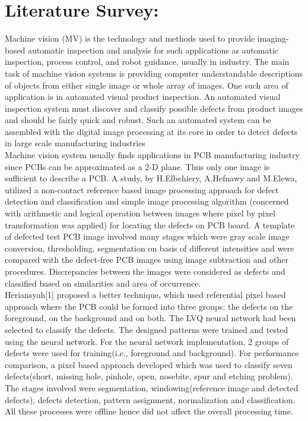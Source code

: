 \documentclass[12pt]{article}
\begin{document}
\section{Literature Survey:}
{\quad}Machine vision (MV) is the technology and methods used to provide imaging-based automatic inspection and analysis for such applications as automatic inspection, process control, and robot guidance, usually in industry. The main task of machine vision systems is providing computer understandable descriptions of objects from either single image or whole array of images. One such area of application  is in automated visual product inspection. An automated visual inspection system must discover and classify possible defects from product images and should be fairly quick and robust. Such an automated system can be assembled with the digital image processing at its core in order to detect defects in large scale manufacturing industries\\
\null{\quad}Machine vision system usually finds applications in PCB manufacturing industry since PCBs can be approximated as a 2-D plane. Thus only one image is sufficient to describe a PCB. A study, by H.Elbehiery, A.Hefnawy and M.Elewa, utilized a non-contact reference based image processing approach for defect detection and classification and simple image processing algorithm (concerned with arithmetic and logical operation between images where pixel by pixel transformation was applied) for locating the defects on PCB board. A template of defected test PCB image involved many stages which were gray scale image conversion, thresholding, segmentation on basis of different  intensities and were compared with the defect-free PCB images using image subtraction and other procedures. Discrepancies between the images were considered as defects and classified based on similarities and area of occurrence.\\

{\quad}Heriansyah[1] proposed a better technique, which used referential pixel based approach where the PCB could be formed into three groups: the defects on the foreground, on the background and on both. The LVQ neural network had been selected to classify the defects. The designed patterns were trained and tested using the neural network. For the neural network implementation, 2 groups of defects were used for training(i.e., foreground and background). For performance comparison, a pixel  based approach developed which was used to classify seven defects(short, missing hole, pinhole, open, nosebite, spur and etching problem). The stages involved were segmentation, windowing(reference image and detected defects), defects detection, pattern assignment, normalization and classification. All these processes were offline hence did not affect the overall processing time.\\
\end{document}

